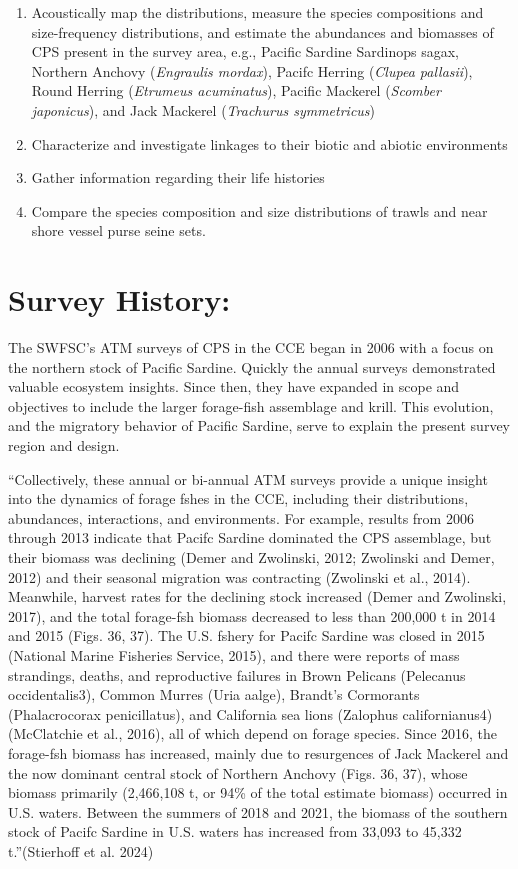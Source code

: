\documentclass[
  letterpaper,
  oneside,
  open=any]{scrbook}
\providecommand{\tightlist}{%
  \setlength{\itemsep}{0pt}\setlength{\parskip}{0pt}}\usepackage{longtable,booktabs,array}
\begin{document}
\begin{enumerate}
\def\labelenumi{\arabic{enumi}.}
\tightlist
\item
  Acoustically map the distributions, measure the species compositions
  and size-frequency distributions, and estimate the abundances and
  biomasses of CPS present in the survey area, e.g., Pacific Sardine
  Sardinops sagax, Northern Anchovy (\emph{Engraulis mordax}), Pacifc
  Herring (\emph{Clupea pallasii}), Round Herring (\emph{Etrumeus
  acuminatus}), Pacific Mackerel (\emph{Scomber japonicus}), and Jack
  Mackerel (\emph{Trachurus symmetricus})
\item
  Characterize and investigate linkages to their biotic and abiotic
  environments
\item
  Gather information regarding their life histories
\item
  Compare the species composition and size distributions of trawls and
  near shore vessel purse seine sets.
\end{enumerate}

\section{Survey History:}\label{survey-history}

The SWFSC's ATM surveys of CPS in the CCE began in 2006 with a focus on
the northern stock of Pacific Sardine. Quickly the annual surveys
demonstrated valuable ecosystem insights. Since then, they have expanded
in scope and objectives to include the larger forage-fish assemblage and
krill. This evolution, and the migratory behavior of Pacific Sardine,
serve to explain the present survey region and design.

``Collectively, these annual or bi-annual ATM surveys provide a unique
insight into the dynamics of forage fshes in the CCE, including their
distributions, abundances, interactions, and environments. For example,
results from 2006 through 2013 indicate that Pacifc Sardine dominated
the CPS assemblage, but their biomass was declining (Demer and
Zwolinski, 2012; Zwolinski and Demer, 2012) and their seasonal migration
was contracting (Zwolinski et al., 2014). Meanwhile, harvest rates for
the declining stock increased (Demer and Zwolinski, 2017), and the total
forage-fsh biomass decreased to less than 200,000 t in 2014 and 2015
(Figs. 36, 37). The U.S. fshery for Pacifc Sardine was closed in 2015
(National Marine Fisheries Service, 2015), and there were reports of
mass strandings, deaths, and reproductive failures in Brown Pelicans
(Pelecanus occidentalis3), Common Murres (Uria aalge), Brandt's
Cormorants (Phalacrocorax penicillatus), and California sea lions
(Zalophus californianus4) (McClatchie et al., 2016), all of which depend
on forage species. Since 2016, the forage-fsh biomass has increased,
mainly due to resurgences of Jack Mackerel and the now dominant central
stock of Northern Anchovy (Figs. 36, 37), whose biomass primarily
(2,466,108 t, or 94\% of the total estimate biomass) occurred in U.S.
waters. Between the summers of 2018 and 2021, the biomass of the
southern stock of Pacifc Sardine in U.S. waters has increased from
33,093 to 45,332 t.''(Stierhoff et al. 2024)
\end{document}

